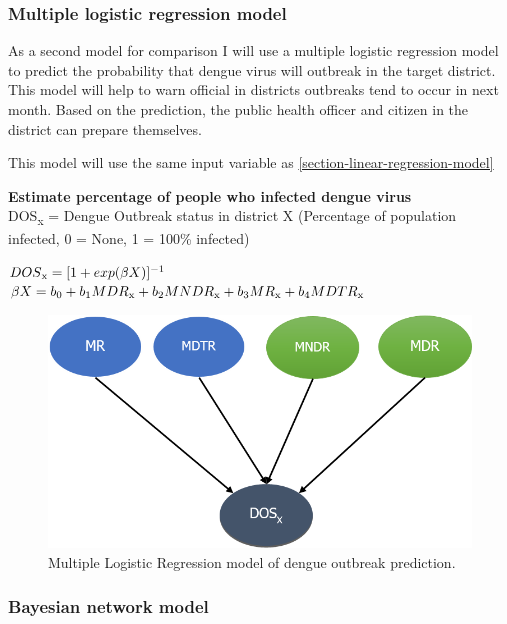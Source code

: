 \documentclass[review]{elsarticle}
\begin{document}
\subsubsection{Multiple logistic regression model}
\label{section-Logistic-regression-model}

As a second model for comparison I will use a multiple logistic regression model to predict the probability that dengue virus will outbreak in the target district. This model will help to warn official in districts outbreaks tend to occur in next month. Based on the prediction, the public health officer and citizen in the district can prepare themselves.

This model will use the same input variable as \ref{section-linear-regression-model}

\textbf{Estimate percentage of people who infected dengue virus}\\

DOS\textsubscript{x} = Dengue Outbreak status in district X (Percentage of population infected, 0 = None, 1 = 100\% infected)

$DOS\textsubscript{x} =  [1 + exp(\beta X)]^{-1}  $ \\
$\beta X =   b\textsubscript{0} + b\textsubscript{1}MDR\textsubscript{x} + b\textsubscript{2}MNDR\textsubscript{x} + b\textsubscript{3}MR\textsubscript{x} + b\textsubscript{4}MDTR\textsubscript{x}$

\begin{figure}[htbp]
	\begin{center}
		\includegraphics[width=120mm]{./figures/logistic_dengue}
		\caption{Multiple Logistic Regression model of dengue outbreak prediction.}
		\label{figure-logistic_dengue}
	\end{center}
\end{figure}

\subsubsection{Bayesian network model}
\label{section-bayesian-network-model}
\end{document}
